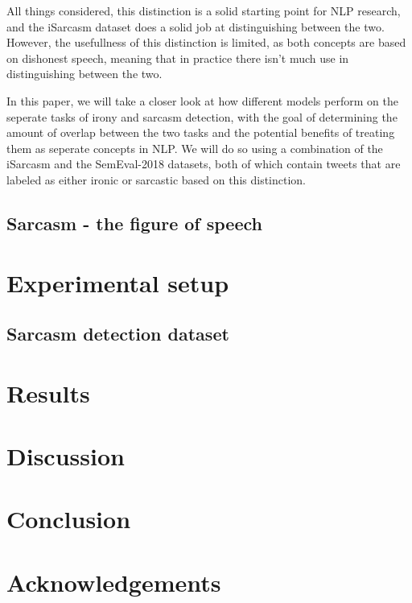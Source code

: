 \documentclass[10pt, a4paper]{article}
\begin{document}
All things considered, this distinction is a solid starting point for NLP research, and the iSarcasm \citep{iSarcasm} dataset
does a solid job at distinguishing between the two. However, the usefullness of this distinction is limited, as both concepts
are based on dishonest speech, meaning that in practice there isn't much use in distinguishing between the two.

In this paper, we will take a closer look at how different models perform on the seperate tasks of irony and sarcasm detection,
with the goal of determining the amount of overlap between the two tasks and the potential benefits of treating them as seperate
concepts in NLP. We will do so using a combination of the iSarcasm \citep{iSarcasm} and the SemEval-2018 \citep{semeval-2018} 
datasets, both of which contain tweets that are labeled as either ironic or sarcastic based on this distinction.

\subsection{Sarcasm - the figure of speech}

\section{Experimental setup}
\subsection{Sarcasm detection dataset}
\citep{iSarcasm}
\section{Results}

\section{Discussion}

\section{Conclusion}

\section*{Acknowledgements}


 
\end{document}
